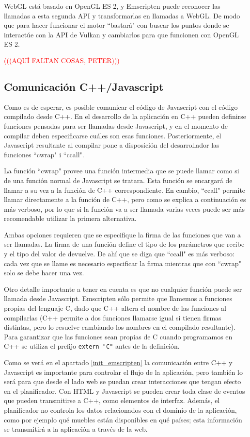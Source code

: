 WebGL está basado en OpenGL ES 2, y Emscripten puede reconocer las llamadas a esta segunda API y transformarlas en llamadas a WebGL. De modo que para hacer funcionar el motor ``bastará" con buscar los puntos donde se interactúe con la API de Vulkan y cambiarlos para que funcionen con OpenGL ES 2.

\textcolor{red}{(((AQUÍ FALTAN COSAS, PETER)))}

\subsection{Comunicación C++/Javascript}
\label{emscripten_comm}
Como es de esperar, es posible comunicar el código de Javascript con el código compilado desde C++. En el desarrollo de la aplicación en C++ pueden definirse funciones pensadas para ser llamadas desde Javascript, y en el momento de compilar deben especificarse cuáles son esas funciones. Posteriormente, el Javascript resultante al compilar pone a disposición del desarrollador las funciones ``cwrap" i ``ccall".

La función ``cwrap" provee una función intermedia que se puede llamar como si de una función normal de Javascript se tratara. Esta función se encargará de llamar a su vez a la función de C++ correspondiente. En cambio, ``ccall" permite llamar directamente a la función de C++, pero como se explica a continuación es más verboso, por lo que si la función va a ser llamada varias veces puede ser más recomendable utilizar la primera alternativa.

Ambas opciones requieren que se especifique la firma de las funciones que van a ser llamadas. La firma de una función define el tipo de los parámetros que recibe y el tipo del valor de devuelve. De ahí que se diga que ``ccall" es más verboso: cada vez que se llame es necesario especificar la firma mientras que con ``cwrap" solo se debe hacer una vez.

Otro detalle importante a tener en cuenta es que no cualquier función puede ser llamada desde Javascript. Emscripten sólo permite que llamemos a funciones propias del lenguaje C, dado que C++ altera el nombre de las funciones al compilarlas (C++ permite a dos funciones llamarse igual si tienen firmas distintas, pero lo resuelve cambiando los nombres en el compilado resultante). Para garantizar que las funciones sean propias de C cuando programamos en C++ se utiliza el prefijo \texttt{extern "C"} antes de la definición.

Como se verá en el apartado \ref{init_emscripten} la comunicación entre C++ y Javascript es importante para controlar el flujo de la aplicación, pero también lo será para que desde el lado web se puedan crear interacciones que tengan efecto en el planificador. Con HTML y Javascript se pueden crear toda clase de eventos que pueden transmitirse a C++, como elementos de interfaz. Además, el planificador no controla los datos relacionados con el dominio de la aplicación, como por ejemplo qué muebles están disponibles en qué países; esta información se transmitirá a la aplicación a través de la web.

